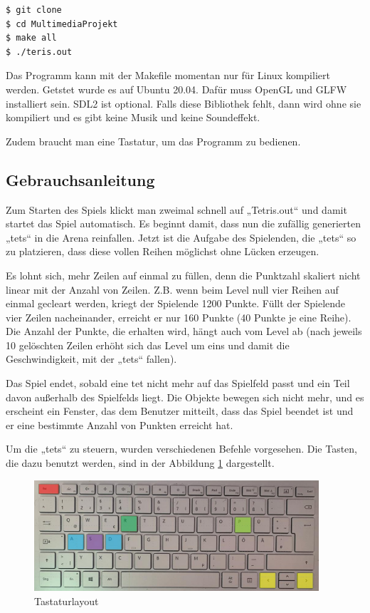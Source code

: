 \documentclass[11pt]{article}
\begin{document}
\begin{lstlisting}[language=bash]
$ git clone 
$ cd MultimediaProjekt
$ make all
$ ./teris.out
\end{lstlisting}

Das Programm kann mit der Makefile momentan nur für Linux kompiliert werden. Getstet wurde es auf Ubuntu 20.04. 
Dafür muss OpenGL und GLFW installiert sein. SDL2 ist optional. Falls diese Bibliothek fehlt, 
dann wird ohne sie kompiliert und es gibt keine Musik und keine Soundeffekt.

Zudem braucht man eine Tastatur, um das Programm zu bedienen.

\subsection{Gebrauchsanleitung} \label{geb}
Zum Starten des Spiels klickt man zweimal schnell auf „Tetris.out“ und damit startet das Spiel automatisch.  
Es beginnt damit, dass nun die zufällig generierten „\glspl {tet}“ in die Arena reinfallen. Jetzt ist die Aufgabe des Spielenden, die „\glspl {tet}“ so zu platzieren, dass diese vollen Reihen möglichst ohne Lücken erzeugen. 

Es lohnt sich, mehr Zeilen auf einmal zu füllen, denn die Punktzahl skaliert nicht linear mit der Anzahl von Zeilen. Z.B. wenn beim Level null vier Reihen auf einmal gecleart werden, kriegt der Spielende 1200 Punkte. Füllt der Spielende vier Zeilen nacheinander, erreicht er nur 160 Punkte (40 Punkte je eine Reihe). 
Die Anzahl der Punkte, die erhalten wird, hängt auch vom Level ab (nach jeweils 10 gelöschten Zeilen erhöht sich das Level um eins und damit die Geschwindigkeit, mit der „\glspl {tet}“ fallen).

Das Spiel endet, sobald eine \gls{tet} nicht mehr auf das Spielfeld passt und ein Teil davon außerhalb des Spielfelds liegt. Die Objekte bewegen sich nicht mehr, und es erscheint ein Fenster, das dem Benutzer mitteilt, dass das Spiel beendet ist und er eine bestimmte Anzahl von Punkten erreicht hat.

Um die „\glspl {tet}“ zu steuern, wurden verschiedenen Befehle vorgesehen. Die Tasten, die dazu benutzt werden, sind in der Abbildung \ref{tat} dargestellt.

\begin{figure}[h]
  \centering
  \includegraphics[width=400px]{../images/keyboard.jpg}
  \caption{Tastaturlayout}
  \label{tat}
\end{figure}
\end{document}
